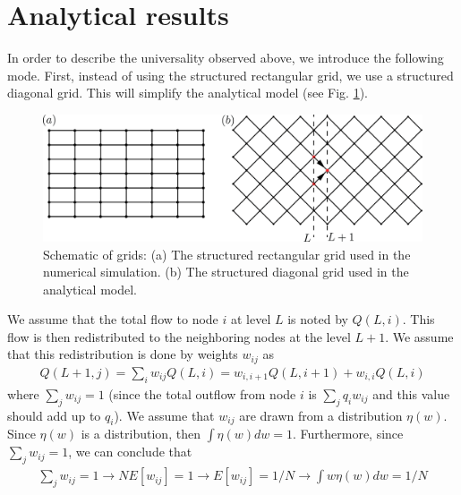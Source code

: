 \section{Analytical results}
%
\label{sec:analytical}
In order to describe the universality observed above, we introduce the
following mode. First, instead of using the structured rectangular
grid, we use a structured diagonal grid. This will simplify the
analytical model (see Fig. \ref{grid-result}). 

%
\begin{figure}[h]
  \centering
  \includegraphics[width=1.0\textwidth]{./Figs/grid-analytica}
  \caption{Schematic of grids: (a) The structured rectangular grid
    used in the numerical simulation. (b) The structured diagonal grid
    used in the analytical model. } \label{grid-result}
\end{figure}
%
We assume that the total flow to node $i$ at level $L$ is noted by
$Q(L,i)$. This flow is then redistributed to the neighboring nodes at
the level $L+1$. We assume that this redistribution is done by weights
$w_{ij}$ as
%
\begin{align}
  Q(L+1,j) = \sum_i w_{ij} Q(L,i) = w_{i,i+1} Q(L,i+1) + w_{i,i} Q(L,i) \label{total-flow}
\end{align}
%
where $\sum_{j} w_{ij} = 1$ (since the total outflow from node $i$ is
$\sum_j q_iw_{ij}$ and this value should add up to $q_i$). We assume
that $w_{ij}$ are drawn from a distribution $\eta(w)$. Since $\eta(w)$
is a distribution, then $\int \eta(w) dw = 1$. Furthermore, since
$\sum_jw_{ij} = 1$, we can conclude that
%
\begin{align}
  \sum_j w_{ij}=1 \to N {E}[w_{ij}] = 1 \to E[w_{ij}] = 1/N \to {\int w\eta(w) dw = 1/N}
\end{align}
%

